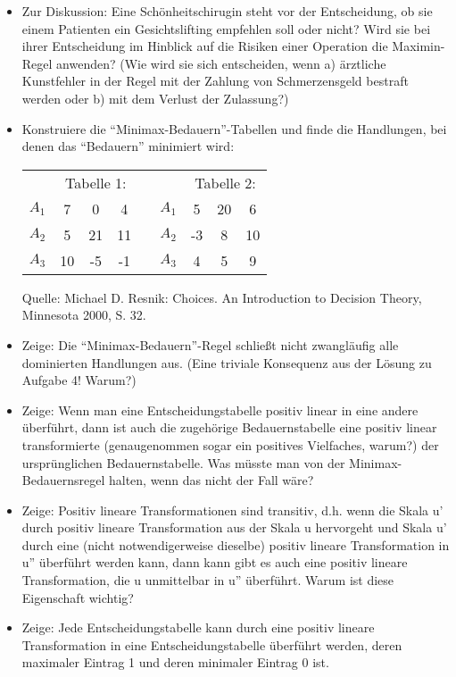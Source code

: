 \begin{itemize}

\item Zur Diskussion: Eine Schönheitschirugin steht vor der Entscheidung, ob sie
einem Patienten ein Gesichtslifting empfehlen soll oder nicht? Wird sie bei
ihrer Entscheidung im Hinblick auf die Risiken einer Operation die Maximin-Regel
anwenden? (Wie wird sie sich entscheiden, wenn a) ärztliche Kunstfehler in der
Regel mit der Zahlung von Schmerzensgeld bestraft werden oder b) mit dem
Verlust der Zulassung?)

\item Konstruiere die "`Minimax-Bedauern"'-Tabellen und finde die Handlungen,
bei denen das "`Bedauern"' minimiert wird:

\begin{center}
\begin{tabular}{c|c|c|c|cc|c|c|c|}
\multicolumn{1}{c}{} & \multicolumn{3}{c}{Tabelle 1:} &
\multicolumn{2}{c}{} & \multicolumn{3}{c}{Tabelle 2:}
\\
\cline{2-4} \cline{7-9}
$A_1$ &  7 &  0 &  4  & & $A_1$ &  5 & 20 &  6  \\ 
\cline{2-4} \cline{7-9} 
$A_2$ &  5 & 21 & 11  & & $A_2$ & -3 &  8 & 10  \\ 
\cline{2-4} \cline{7-9}
$A_3$ & 10 & -5 & -1  & & $A_3$ &  4 &  5 &  9  \\ 
\cline{2-4} \cline{7-9}
\end{tabular}

{\tiny Quelle: Michael D. Resnik: Choices. An Introduction to Decision Theory,
Minnesota 2000, S. 32.}
\end{center} 

\item Zeige: Die "`Minimax-Bedauern"'-Regel schließt nicht zwangläufig alle
dominierten Handlungen aus. (Eine triviale Konsequenz aus der Lösung zu Aufgabe
4! Warum?)

\item Zeige: Wenn man eine Entscheidungstabelle positiv linear in eine andere
überführt, dann ist auch die zugehörige Bedauernstabelle eine positiv linear
transformierte (genaugenommen sogar ein positives Vielfaches, warum?) der
ursprünglichen Bedauernstabelle. Was müsste man von der Minimax-Bedauernsregel
halten, wenn das nicht der Fall wäre?

\item Zeige: Positiv lineare Transformationen sind transitiv, d.h. wenn die
Skala u' durch positiv lineare Transformation aus der Skala u hervorgeht und
Skala u' durch eine (nicht notwendigerweise dieselbe) positiv lineare
Transformation in u'' überführt werden kann, dann kann gibt es auch eine
positiv lineare Transformation, die u unmittelbar in u'' überführt. Warum ist
diese Eigenschaft wichtig?

\item Zeige: Jede Entscheidungstabelle kann durch eine positiv lineare
Transformation in eine Entscheidungstabelle überführt werden, deren maximaler
Eintrag 1 und deren minimaler Eintrag 0 ist.

\end{itemize}
